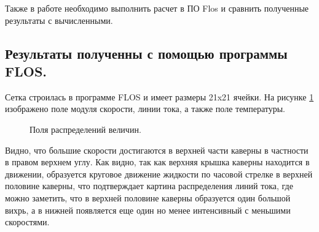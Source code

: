 Также в работе необходимо выполнить расчет в ПО Flos и сравнить полученные результаты с вычисленными.

\subsection{Результаты полученны с помощью программы FLOS.}
Сетка строилась в программе FLOS и имеет размеры 21x21 ячейки. На рисунке \ref{fig:01} изображено поле модуля скорости, линии тока, а также поле температуры.
\begin{figure}[H]
    \centering
    \caption{Поля распределений величин.}
    \label{fig:01}
\end{figure}
Видно, что большие скорости достигаются в верхней части каверны в частности в правом верхнем углу. Как видно, так как верхняя крышка каверны находится в
движении, образуется круговое движение жидкости по часовой стрелке в
верхней половине каверны, что подтверждает картина распределения линий
тока, где можно заметить, что в верхней половине каверны
образуется один большой вихрь, а в нижней появляется еще один но менее интенсивный с меньшими скоростями.

